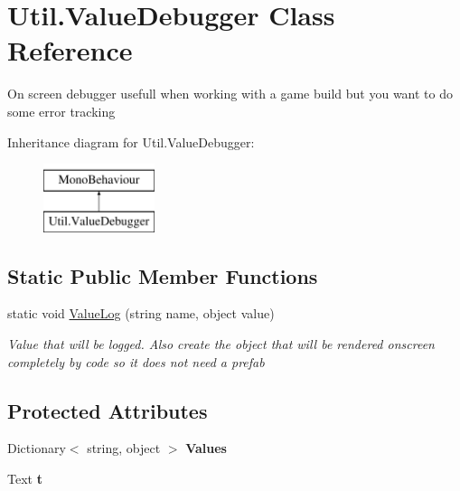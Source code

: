 \hypertarget{class_util_1_1_value_debugger}{}\section{Util.\+Value\+Debugger Class Reference}
\label{class_util_1_1_value_debugger}


On screen debugger usefull when working with a game build but you want to do some error tracking  


Inheritance diagram for Util.\+Value\+Debugger\+:\begin{figure}[H]
\begin{center}
\leavevmode
\includegraphics[height=2.000000cm]{class_util_1_1_value_debugger}
\end{center}
\end{figure}
\subsection*{Static Public Member Functions}
\begin{DoxyCompactItemize}
\item 
static void \hyperlink{class_util_1_1_value_debugger_a5716ccc5130a9034326be2ca7a86ca33}{Value\+Log} (string name, object value)
\begin{DoxyCompactList}\small\item\em Value that will be logged. Also create the object that will be rendered onscreen completely by code so it does not need a prefab \end{DoxyCompactList}\end{DoxyCompactItemize}
\subsection*{Protected Attributes}
\begin{DoxyCompactItemize}
\item 
Dictionary$<$ string, object $>$ {\bfseries Values}\hypertarget{class_util_1_1_value_debugger_a14e78acfd0a9df95ade816a1bdfb940c}{}\label{class_util_1_1_value_debugger_a14e78acfd0a9df95ade816a1bdfb940c}

\item 
Text {\bfseries t}\hypertarget{class_util_1_1_value_debugger_af93bcd716946c3554f4a524b87b63907}{}\label{class_util_1_1_value_debugger_af93bcd716946c3554f4a524b87b63907}

\end{DoxyCompactItemize}


